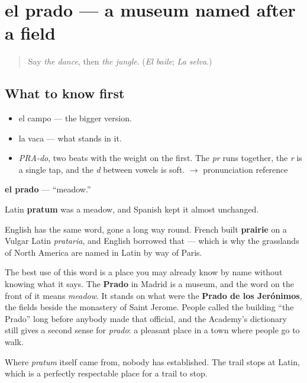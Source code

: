 \section[el prado]{el prado — a museum named after a field}

\label{lesson:ES-C378-prado}



\begin{quote}
Say \emph{the dance}, then \emph{the jungle}. (\emph{El baile}; \emph{La selva}.)
\end{quote}

\subsection*{What to know first}
\begin{itemize}
\raggedright
  \item el campo — the bigger version.
  \item la vaca — what stands in it.
\end{itemize}

\begin{sounds}
\begin{itemize}
\raggedright
  \item \emph{PRA-do}, two beats with the weight on the first. The \emph{pr} runs together, the \emph{r} is a single tap, and the \emph{d} between vowels is soft. $\to$ pronunciation reference
\end{itemize}
\end{sounds}

\begin{cousinweb}
\textbf{el prado} — \textquotedblleft{}meadow.\textquotedblright{}

Latin \textbf{pratum} was a meadow, and Spanish kept it almost unchanged.

English has the same word, gone a long way round. French built \textbf{prairie} on a Vulgar Latin \emph{prataria}, and English borrowed that — which is why the grasslands of North America are named in Latin by way of Paris.

The best use of this word is a place you may already know by name without knowing what it says. The \textbf{Prado} in Madrid is a museum, and the word on the front of it means \emph{meadow}. It stands on what were the \textbf{Prado de los Jerónimos}, the fields beside the monastery of Saint Jerome. People called the building \textquotedblleft{}the Prado\textquotedblright{} long before anybody made that official, and the Academy's dictionary still gives a second sense for \emph{prado}: a pleasant place in a town where people go to walk.

Where \emph{pratum} itself came from, nobody has established. The trail stops at Latin, which is a perfectly respectable place for a trail to stop.
\end{cousinweb}

